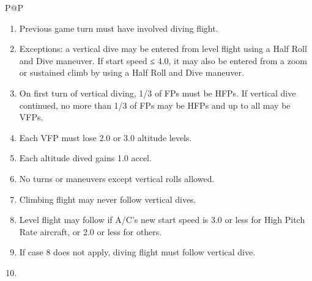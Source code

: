 \begin{twocolumntablefloat}
\begin{twocolumntable}
\begin{tabularx}{\linewidth}{P@{\hspace{1em}}P}

            \begin{enumerate}[nosep]
                \item Previous game turn must have involved diving flight.
                \item Exceptions: a vertical dive may be entered from level flight using a Half Roll and Dive maneuver. If start speed ≤ 4.0, it may also be entered from a zoom or sustained climb by using a Half Roll and Dive maneuver.
                \item On first turn of vertical diving, 1/3 of FPs must be HFPs. If vertical dive continued, no more than 1/3 of FPs may be HFPs and up to all may be VFPs.
                \item Each VFP must lose 2.0 or 3.0 altitude levels.
                \item Each altitude dived gains 1.0 accel.
                \item No turns or maneuvers except vertical rolls allowed.
                \item Climbing flight may never follow vertical dives.
                \item Level flight may follow if A/C's new start speed is 3.0 or less for High Pitch Rate aircraft, or 2.0 or less for others.
                \item[--] If case 8 does not apply, diving flight must follow vertical dive.
                \item {}
            \end{enumerate}

\end{tabularx}
\end{twocolumntable}
\end{twocolumntablefloat}

